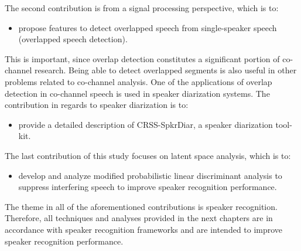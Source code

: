 The second contribution is from a signal processing perspective, which is to:
\begin{itemize}
	\item propose features to detect overlapped speech from single-speaker speech (overlapped speech detection).
\end{itemize}
This is important, since overlap detection constitutes a significant portion of co-channel research. 
Being able to detect overlapped segments is also useful in other problems related to co-channel analysis. 
One of the applications of overlap detection in co-channel speech is used in speaker diarization systems. 
The contribution in regards to speaker diarization is to:
\begin{itemize}
	\item provide a detailed description of CRSS-SpkrDiar, a speaker diarization tool-kit. 
\end{itemize}
The last contribution of this study focuses on latent space analysis, which is to:
\begin{itemize}
	\item develop and analyze modified probabilistic linear discriminant analysis to suppress interfering speech to improve speaker recognition performance. 
\end{itemize}
The theme in all of the aforementioned contributions is speaker recognition. 
Therefore, all techniques and analyses provided in the next chapters are in accordance with speaker recognition frameworks and are intended to improve speaker recognition performance. 

